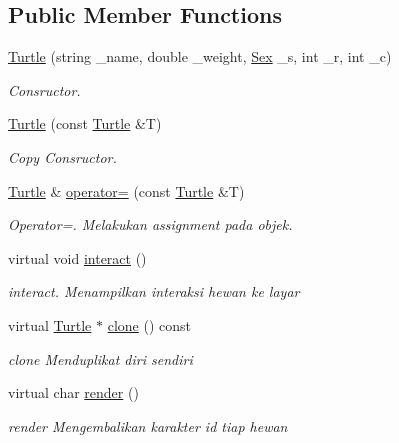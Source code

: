 \subsection*{Public Member Functions}
\begin{DoxyCompactItemize}
\item 
\hyperlink{classTurtle_ab76b834a435eb0b660a18c93861361a9}{Turtle} (string \+\_\+name, double \+\_\+weight, \hyperlink{sex_8h_a2633cb393c68bb2ee8080db58fb7ba93}{Sex} \+\_\+s, int \+\_\+r, int \+\_\+c)
\begin{DoxyCompactList}\small\item\em Consructor. \end{DoxyCompactList}\item 
\hyperlink{classTurtle_abc6d279e23ee90c4601277ff5a2ff8fd}{Turtle} (const \hyperlink{classTurtle}{Turtle} \&T)
\begin{DoxyCompactList}\small\item\em Copy Consructor. \end{DoxyCompactList}\item 
\hyperlink{classTurtle}{Turtle} \& \hyperlink{classTurtle_ac25721b76371d4993966a56a5dec083e}{operator=} (const \hyperlink{classTurtle}{Turtle} \&T)
\begin{DoxyCompactList}\small\item\em Operator=. Melakukan assignment pada objek. \end{DoxyCompactList}\item 
virtual void \hyperlink{classTurtle_a5ea131c173457031494504005395b511}{interact} ()
\begin{DoxyCompactList}\small\item\em interact. Menampilkan interaksi hewan ke layar \end{DoxyCompactList}\item 
virtual \hyperlink{classTurtle}{Turtle} $\ast$ \hyperlink{classTurtle_ae63e85cb0508d8cf7a254d8d02b05bf5}{clone} () const 
\begin{DoxyCompactList}\small\item\em clone Menduplikat diri sendiri \end{DoxyCompactList}\item 
virtual char \hyperlink{classTurtle_a15d2f519b18a2a141c98b32688928b1d}{render} ()
\begin{DoxyCompactList}\small\item\em render Mengembalikan karakter id tiap hewan \end{DoxyCompactList}\item 

\end{DoxyCompactItemize}
